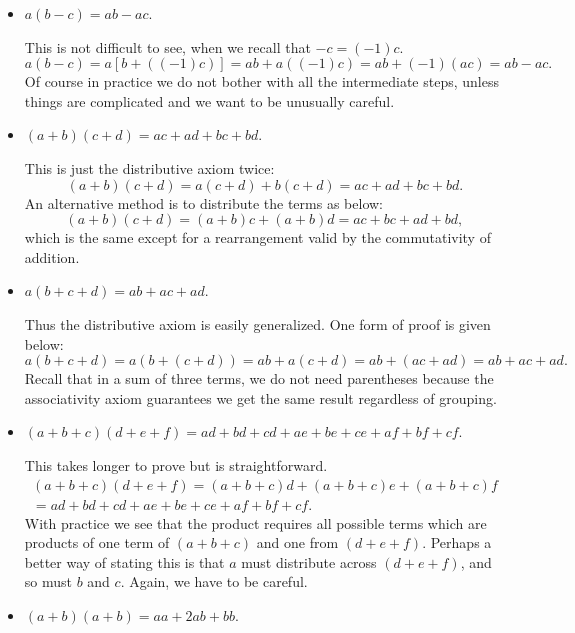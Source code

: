 \begin{itemize}

\item $a(b-c)=ab-ac$.

This is not difficult to see, when we recall that $-c=(-1)c$.
$$a(b-c)=a[b+((-1)c)]=ab+a((-1)c)=ab+(-1)(ac)=ab-ac.$$
Of course in practice we do not bother with all the 
intermediate steps, unless things are complicated and we
want to be unusually careful.

\item $(a+b)(c+d)=ac+ad+bc+bd$.\footnotemark\hphantom{. }%

This is just the distributive axiom twice:
$$(a+b)(c+d)=a(c+d)+b(c+d)=ac+ad+bc+bd.$$
An alternative method is to distribute the terms as below:
$$(a+b)(c+d)=(a+b)c+(a+b)d=ac+bc+ad+bd,$$
which is the same except for a rearrangement valid by
the commutativity  of addition.

\item $a(b+c+d)=ab+ac+ad$.  

Thus the distributive axiom is easily generalized.
One form of proof is given below:
$$a(b+c+d)=a(b+(c+d))=ab+a(c+d)=ab+(ac+ad)=ab+ac+ad.$$
Recall that in a sum of three terms, we do not need
parentheses because the associativity axiom guarantees
we get the same result regardless of grouping.

\item $(a+b+c)(d+e+f)=ad+bd+cd+ae+be+ce+af+bf+cf$.

This takes longer to prove but is straightforward.
\begin{align*}(a+b+c)(d+e+f)=(a+b+c)d+(a+b+c)e+(a+b+c)f\\
 =ad+bd+cd+ae+be+ce+af+bf+cf.\end{align*}
With practice we see that the product requires all
possible terms which are products of one term
of $(a+b+c)$ and one from $(d+e+f)$.  Perhaps
a better way of stating this is that
$a$ must distribute across $(d+e+f)$, and 
so must $b$ and $c$.  Again, we have to be careful.

\item $(a+b)(a+b)=aa+2ab+bb$.



\end{itemize}
